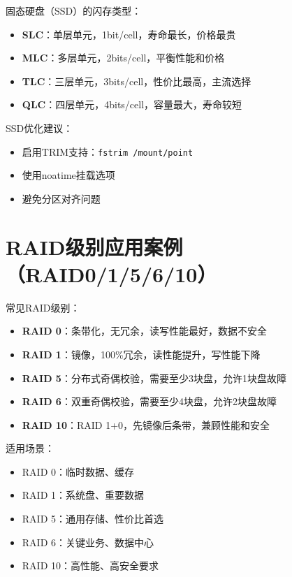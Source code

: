 \documentclass[12pt,UTF8]{ctexbook}
\begin{document}
固态硬盘（SSD）的闪存类型：

\begin{itemize}
    \item \textbf{SLC}：单层单元，1bit/cell，寿命最长，价格最贵
    \item \textbf{MLC}：多层单元，2bits/cell，平衡性能和价格
    \item \textbf{TLC}：三层单元，3bits/cell，性价比最高，主流选择
    \item \textbf{QLC}：四层单元，4bits/cell，容量最大，寿命较短
\end{itemize}

SSD优化建议：
\begin{itemize}
    \item 启用TRIM支持：\texttt{fstrim /mount/point}
    \item 使用noatime挂载选项
    \item 避免分区对齐问题
\end{itemize}

\section{RAID级别应用案例（RAID0/1/5/6/10）}
\label{sec:raid-cases}

常见RAID级别：

\begin{itemize}
    \item \textbf{RAID 0}：条带化，无冗余，读写性能最好，数据不安全
    \item \textbf{RAID 1}：镜像，100\%冗余，读性能提升，写性能下降
    \item \textbf{RAID 5}：分布式奇偶校验，需要至少3块盘，允许1块盘故障
    \item \textbf{RAID 6}：双重奇偶校验，需要至少4块盘，允许2块盘故障
    \item \textbf{RAID 10}：RAID 1+0，先镜像后条带，兼顾性能和安全
\end{itemize}

适用场景：
\begin{itemize}
    \item RAID 0：临时数据、缓存
    \item RAID 1：系统盘、重要数据
    \item RAID 5：通用存储、性价比首选
    \item RAID 6：关键业务、数据中心
    \item RAID 10：高性能、高安全要求
\end{itemize}
\end{document}

